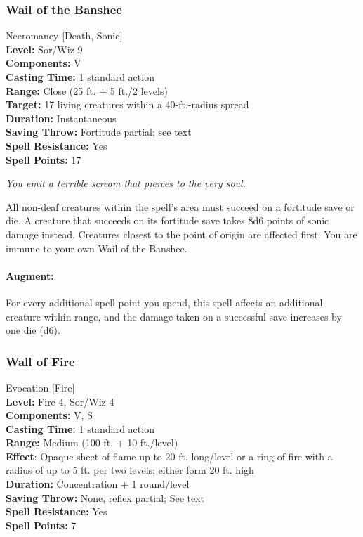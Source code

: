 \subsubsection{Wail of the Banshee}
\label{Spell:WailOfTheBanshee}
Necromancy [Death, Sonic]
\\ \textbf{Level:} Sor/Wiz 9
\\ \textbf{Components:} V
\\ \textbf{Casting Time:} 1 standard action
\\ \textbf{Range:} Close (25 ft. + 5 ft./2 levels)
\\ \textbf{Target:} 17 living creatures within a 40-ft.-radius spread
\\ \textbf{Duration:} Instantaneous
\\ \textbf{Saving Throw:} Fortitude partial; see text
\\ \textbf{Spell Resistance:} Yes
\\ \textbf{Spell Points:} 17

\emph{You emit a terrible scream that pierces to the very soul.} 

All non-deaf creatures within the spell's area must succeed on a fortitude save or die. A creature that succeeds on its fortitude save takes 8d6 points of sonic damage instead. Creatures closest to the point of origin are affected first. You are immune to your own Wail of the Banshee.

\paragraph{Augment:} For every additional spell point you spend, this spell affects an additional creature within range, 
and the damage taken on a successful save increases by one die (d6).
\subsubsection{Wall of Fire}
\label{Spell:WallOfFire}
Evocation [Fire]
\\ \textbf{Level:} Fire 4, Sor/Wiz 4
\\ \textbf{Components:} V, S
\\ \textbf{Casting Time:} 1 standard action
\\ \textbf{Range:} Medium (100 ft. + 10 ft./level)
\\ \textbf{Effect}: Opaque sheet of flame up to 20 ft. long/level or a ring of fire with a radius of up to 5 ft. per two levels; either form 20 ft. high
\\ \textbf{Duration:} Concentration + 1 round/level
\\ \textbf{Saving Throw:} None, reflex partial; See text
\\ \textbf{Spell Resistance:} Yes
\\ \textbf{Spell Points:} 7

